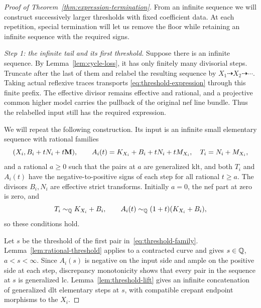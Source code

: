 \begin{proof}[Proof of Theorem~\ref{thm:expression-termination}]
From an infinite sequence we will construct successively larger
thresholds with fixed coefficient data.  At each repetition,
special termination will let us remove the floor while retaining an
infinite sequence with the required signs.

\smallskip\noindent
\emph{Step 1: the infinite tail and its first threshold.}
Suppose there is an infinite sequence.  By Lemma~\ref{lem:cycle-loss},
it has only finitely many divisorial steps.  Truncate after the last of
them and relabel the resulting sequence by $X_1\dashrightarrow X_2
\dashrightarrow\cdots$.  Taking actual reflexive traces transports
\eqref{eq:threshold-expression} through this finite prefix.  The
effective divisor remains effective and rational, and a projective
common higher model carries the pullback of the original nef line
bundle.  Thus the relabelled input still has the required expression.

We will repeat the following construction.  Its input is an infinite
small elementary sequence with rational families
\begin{equation}\label{eq:threshold-family}
 (X_i,B_i+tN_i+t\mathbf M),\qquad
 A_i(t)=K_{X_i}+B_i+tN_i+tM_{X_i},
 \quad T_i=N_i+M_{X_i},
\end{equation}
and a rational $a\geq0$ such that the pairs at $a$ are generalized klt,
and both $T_i$ and $A_i(t)$ have the negative-to-positive signs of each
step for all rational $t\geq a$.  The divisors $B_i,N_i$ are effective
strict transforms.  Initially $a=0$, the nef part at zero is zero, and
\[
 T_i\sim_{\mathbb Q} K_{X_i}+B_i,
 \qquad A_i(t)\sim_{\mathbb Q}(1+t)(K_{X_i}+B_i),
\]
so these conditions hold.

Let $s$ be the threshold of the first pair in~\eqref{eq:threshold-family}.
Lemma~\ref{lem:rational-threshold} applies to a contracted curve and gives
$s\in\mathbb Q$, $a<s<\infty$.  Since $A_i(s)$ is negative on the input side
and ample on the positive side at each step, discrepancy monotonicity
shows that every pair in the sequence at $s$ is generalized lc.
Lemma~\ref{lem:threshold-lift} gives an infinite concatenation of
generalized dlt elementary steps at $s$, with compatible crepant
endpoint morphisms to the $X_i$.


\end{proof}
